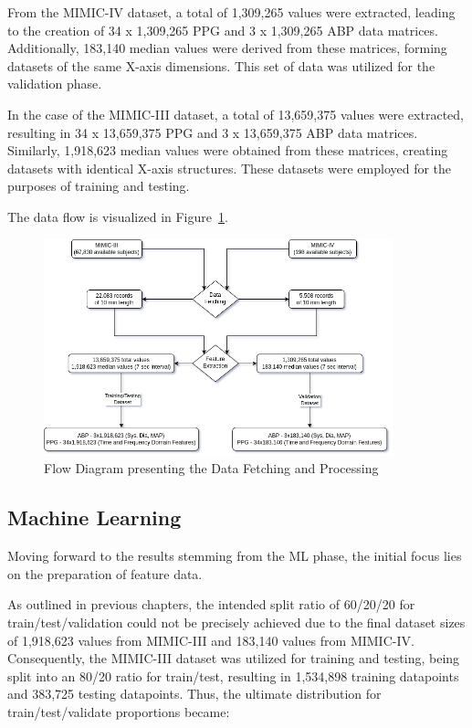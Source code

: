 From the MIMIC-IV dataset, a total of 1,309,265 values were extracted, leading to the creation of 34 x 1,309,265 PPG and 3 x 1,309,265 ABP data matrices.
Additionally, 183,140 median values were derived from these matrices, forming datasets of the same X-axis dimensions.
This set of data was utilized for the validation phase.

In the case of the MIMIC-III dataset, a total of 13,659,375 values were extracted, resulting in 34 x 13,659,375 PPG and 3 x 13,659,375 ABP data matrices.
Similarly, 1,918,623 median values were obtained from these matrices, creating datasets with identical X-axis structures.
These datasets were employed for the purposes of training and testing.

The data flow is visualized in Figure~\ref{fig:data_flow}.

\begin{figure}[h]
    \centering
    \includegraphics[width=0.9\textwidth]{images/results/flow_diagram}
    \caption{Flow Diagram presenting the Data Fetching and Processing}
    \label{fig:data_flow}
\end{figure}

\newpage

\subsection{Machine Learning}
\label{subsec:machine_learning}

Moving forward to the results stemming from the ML phase, the initial focus lies on the preparation of feature data.

As outlined in previous chapters, the intended split ratio of 60/20/20 for train/test/validation could not be precisely achieved due to the final dataset sizes of 1,918,623 values from MIMIC-III and 183,140 values from MIMIC-IV\@.
Consequently, the MIMIC-III dataset was utilized for training and testing, being split into an 80/20 ratio for train/test, resulting in 1,534,898 training datapoints and 383,725 testing datapoints.
Thus, the ultimate distribution for train/test/validate proportions became:

